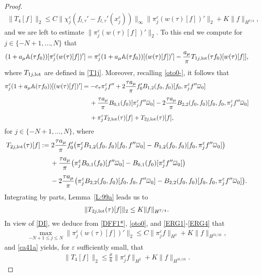 \documentclass[11pt,reqno]{amsart}
\numberwithin{equation}{section}
\newcommand{\0}{\Omega}
\newcommand{\e}{\varepsilon}
\newcommand{\ov}{\overline}
\newcommand{\oo}{\ov\omega}
\newcommand{\bA}{\mathbb{A}}
\numberwithin{equation}{section}
\begin{document}
\begin{proof}
\begin{align}
 \|T_{4}[f]\|_2\leq C\|\chi_j^\e(f_{l,\tau}'-f_{l,\tau}'(x_j^\e))  \|_\infty\|\pi^\e_j(w(\tau)[f])' \|_2 +K\|f\|_{H^{7/4}},
\end{align}
  and we are left to estimate $\|\pi^\e_j(w(\tau)[f])' \|_2.$
To this end we compute for $j\in\{-N+1,\ldots, N\}$ that 
\begin{align}
 (1+a_\mu\bA(\tau f_0))[\pi_j^\e(w(\tau)[f])' ]=\pi_j^\e(1+a_\mu\bA(\tau f_0))[(w(\tau)[f])']-\frac{  a_\mu}{\pi}T_{1j, {\rm lot}}(\tau f_0)[w(\tau)[f]],\label{ERG1}
\end{align}
where $T_{1j, {\rm lot}}$ are defined in \eqref{T1j}.
Moreover, recalling \eqref{oto0-}, it follows  that 
\begin{align}
 \pi_j^\e(1+a_\mu\bA(\tau f_0))[(w(\tau)[f])'] &=-c_\tau \pi_j^\e f''+2\frac{\tau a_\mu}{\pi}f_0'B_{1,2}(f_0,f_0)[f_0,\pi_j^\e f''\oo_0]\nonumber\\[1ex]
 &\hspace{0.424cm}+\frac{\tau a_\mu}{\pi}B_{0,1}(f_0)[\pi_j^\e f''\oo_0]-2\frac{\tau a_\mu}{\pi}B_{2,2}(f_0,f_0)[f_0, f_0,\pi_j^\e f''\oo_0]\nonumber\\[1ex]
 &\hspace{0.424cm}+\pi_j^\e T_{2,{\rm lot}}(\tau)[f] +T_{2j, {\rm lot}}(\tau)[f],\label{ERG3}
\end{align}
for $j\in\{-N+1,\ldots,N\} $, where
\begin{align*}
T_{2j, {\rm lot}}(\tau)[f]&:=2\frac{\tau a_\mu}{\pi}f_0'\big(\pi_j^\e B_{1,2}(f_0,f_0)[f_0, f''\oo_0]-B_{1,2}(f_0,f_0)[f_0,\pi_j^\e f''\oo_0]\big)\\[1ex]
 &\hspace{0.424cm}\phantom{:}+\frac{\tau a_\mu}{\pi}\big(\pi_j^\e B_{0,1}(f_0)[ f''\oo_0]-B_{0,1}(f_0)[\pi_j^\e f''\oo_0]\big)\\[1ex]
 &\hspace{0.424cm}\phantom{:}-2\frac{\tau a_\mu}{\pi}\big(\pi_j^\e B_{2,2}(f_0,f_0)[f_0, f_0, f''\oo_0]-B_{2,2}(f_0,f_0)[f_0, f_0,\pi_j^\e f''\oo_0]\big).
\end{align*}
Integrating by parts,   Lemma~\ref{L:99a}  leads us to
\begin{align}\label{ERG4}
 \|T_{2j, {\rm lot}}(\tau)[f]\|_2\leq K\|f\|_{H^{7/4}}.
\end{align}
In view of \eqref{DI}, we deduce from  \eqref{DFF1*}, \eqref{oto0}, and \eqref{ERG1}-\eqref{ERG4} that 
\begin{align}\label{Ij}
 \max_{-N+1\leq j\leq N}\|\pi_j^\e (w(\tau)[f])'\|_2\leq C\|\pi_j^\e f\|_{H^2}+K\|f\|_{H^{31/16}},
\end{align}
and   \eqref{ca41a}  yields, for $\e$  sufficiently small, that 
\begin{align}\label{ca41}
 \|T_{4}[f]\|_2\leq \frac{\mu}{6}\|\pi_j^\e f\|_{H^2} +K\|f\|_{H^{31/16}}.
\end{align}



\end{proof}
\end{document}
